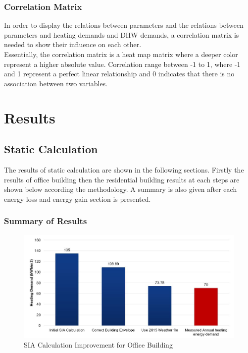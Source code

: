 \documentclass[11pt, a4paper]{article}
\theoremstyle{definition}
\begin{document}
		\subsubsection{Correlation Matrix}
			In order to display the relations between parameters and the relations between parameters and heating demands and DHW demands, a correlation matrix is needed to show their influence on each other. \\
			Essentially, the correlation matrix is a heat map matrix where a deeper color represent a higher absolute value. Correlation range between -1 to 1, where -1 and 1 represent a perfect linear relationship and 0 indicates that there is no association between two variables.\\
		


\newpage
\section{Results}

	\subsection{Static Calculation}
		The results of static calculation are shown in the following sections. Firstly the results of office building then the residential building results at each steps are shown below according the methodology. A summary is also given after each energy loss and energy gain section is presented.

		\subsubsection{Summary of Results}

		\begin{figure}[H]
		\centering
		\includegraphics[scale=0.4]{Office_SIA.jpg}
		\caption{SIA Calculation Improvement for Office Building}
		\label{fig:Sumatra_SIA}
		\end{figure}
		
\end{document}
